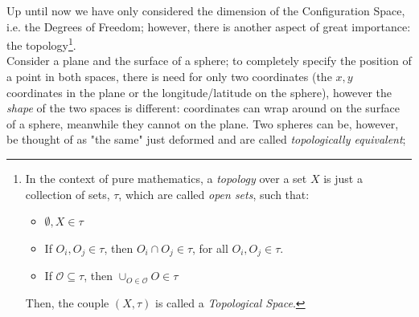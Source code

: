         Up until now we have only considered the dimension of the Configuration Space, i.e. the Degrees of Freedom; however, there is another aspect of great importance: the topology\footnote{In the context of pure mathematics, a \textit{topology} over a set $X$ is just a collection of sets, $\tau$, which are called \textit{open sets}, such that:
        \begin{itemize}
            \item $\emptyset,X\in \tau$ 
            \item If $O_i,O_j \in \tau$, then $O_i\cap O_j\in\tau$, for all $O_i,O_j \in \tau$.
            \item If $\mathcal{O}\subseteq \tau$, then $\cup_{O\in\mathcal{O}}O\in\tau$
        \end{itemize}
        Then, the couple $(X,\tau)$ is called a \textit{Topological Space}.}. \\
        Consider a plane and the surface of a sphere; to completely specify the position of a point in both spaces, there is need for only two coordinates (the $x,y$ coordinates in the plane or the longitude/latitude on the sphere), however the \textit{shape} of the two spaces is different: coordinates can wrap around on the surface of a sphere, meanwhile they cannot on the plane. Two spheres can be, however, be thought of as "the same" just deformed and are called \textit{topologically equivalent}; 
